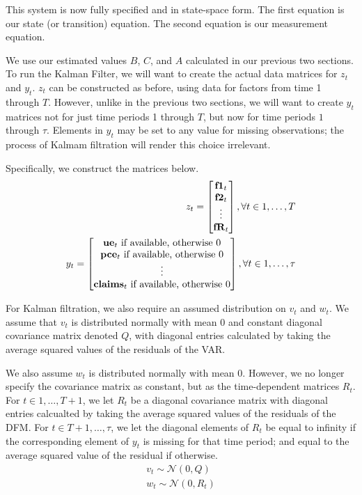 \documentclass[11pt, letterpaper]{article}\usepackage[]{graphicx}\usepackage[]{color}
\newcommand{\vv}[1]{\textcolor{black}{\mathbf{#1}}}
\begin{document}
This system is now fully specified and in state-space form. The first equation is our state (or transition) equation. The second equation is our measurement equation. 

We use our estimated values $B$, $C$, and $A$ calculated in our previous two sections. To run the Kalman Filter, we will want to create the actual data matrices for $z_t$ and $y_t$. $z_t$ can be constructed as before, using data for factors from time 1 through $T$. However, unlike in the previous two sections, we will want to create $y_t$ matrices not for just time periods 1 through $T$, but now for time periods $1$ through $\tau$. Elements in $y_t$ may be set to any value for missing observations; the process of Kalmam filtration will render this choice irrelevant.

Specifically, we construct the matrices below.
\begin{align*}
z_t
=
\begin{bmatrix}
	\vv{f1}_{t}\\
	\vv{f2}_{t}\\
	\vdots \\
	\vv{fR}_{t}
\end{bmatrix}, \forall t \in 1, \dots, T\\
y_t
=
\begin{bmatrix}
	\text{$\vv{ue}_{t}$ if available, otherwise 0}\\
	\text{$\vv{pce}_{t}$ if available, otherwise 0}\\
	\vdots \\
	\text{$\vv{claims}_{t}$ if available, otherwise 0}\\
\end{bmatrix}, \forall t \in 1, \dots, \tau
\end{align*}

For Kalman filtration, we also require an assumed distribution on $v_t$ and $w_t$. We assume that $v_t$ is distributed normally with mean 0 and constant diagonal covariance matrix denoted $Q$, with diagonal entries calculated by taking the average squared values of the residuals of the VAR.

We also assume $w_t$ is distributed normally with mean $0$. However, we no longer specify the covariance matrix as constant, but as the time-dependent matrices $R_t$. For $t \in 1, \dots, T+1$, we let $R_t$ be a diagonal covariance matrix with diagonal entries calcualted by taking the average squared values of the residuals of the DFM. For $t \in T+1, \dots, \tau$, we let the diagonal elements of $R_t$ be equal to infinity if the corresponding element of $y_t$ is missing for that time period; and equal to the average squared value of the residual if otherwise.
\begin{align*}
	v_t \sim \mathcal{N}(0, Q)\\
	w_t \sim \mathcal{N}(0, R_t)
\end{align*}
\end{document}
